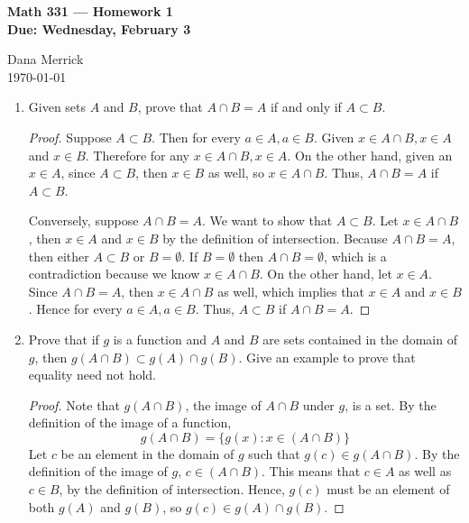 \documentclass[12pt]{amsart}
\begin{document}
\thispagestyle{empty}

\begin{center}
{\bf Math 331  --- Homework 1 \\
Due:  Wednesday, February 3}
\end{center}

\bigskip

\noindent
Dana Merrick \\
\today

\bigskip

\begin{enumerate}
\renewcommand{\itemsep}{6pt}
\item Given sets $A$ and $B$, prove that $A\cap B = A$ if and only if
  $A\subset B$. 
  
\begin{proof}
Suppose $A\subset B$. Then for every $a\in A, a\in B$. Given $x\in A\cap B, x\in A$ and $x\in B$. Therefore for any $x\in A\cap B, x\in A$. On the other hand, given an $x\in A$, since $A\subset B$, then $x\in B$ as well, so $x\in A\cap B$. Thus, $A\cap B = A$ if $A\subset B$.

Conversely, suppose $A\cap B = A$. We want to show that $A\subset B$. Let $x\in A\cap B$, then $x\in A$ and $x\in B$ by the definition of intersection. Because $A\cap B = A$, then either $A\subset B$ or $B = \emptyset$. If $B = \emptyset$ then $A\cap B = \emptyset$, which is a contradiction because we know $x\in A\cap B$. On the other hand, let $x\in A$. Since $A\cap B = A$, then $x\in A\cap B$ as well, which implies that $x\in A$ and $x\in B$. Hence for every $a\in A, a\in B$. Thus, $A\subset B$ if $A\cap B = A$.
\end{proof}

\item Prove that if $g$ is a function and $A$ and $B$ are sets
  contained in the domain of $g$, then $g(A\cap B)\subset g(A)\cap
  g(B)$. Give an example to prove that equality need not hold.
  
\begin{proof}
Note that $g(A\cap B)$, the image of $A\cap B$ under $g$, is a set. By the definition of the image of a function,
\[ g(A\cap B) = \{ g(x) : x \in (A\cap B) \} \]
Let $c$ be an element in the domain of $g$ such that $g(c)\in g(A\cap B)$. By the definition of the image of $g$, $c\in (A\cap B)$. This means that $c\in A$ as well as $c\in B$, by the definition of intersection. Hence, $g(c)$ must be an element of both $g(A)$ and $g(B)$, so $g(c)\in g(A)\cap g(B)$.
\end{proof}


\end{enumerate}
\end{document}
